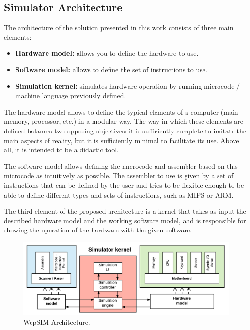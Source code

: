\subsection*{Simulator Architecture}

The architecture of the solution presented in this work consists of three main elements:

\begin{itemize}
\item \textbf{Hardware model:} allows you to define the hardware to use.
\item \textbf{Software model:} allows to define the set of instructions to use.
\item \textbf{Simulation kernel:} simulates hardware operation by running microcode / machine language previously defined.
\end{itemize}

The hardware model allows to define the typical elements of a computer (main memory, processor, etc.) in a modular way. The way in which these elements are defined balances two opposing objectives: it is sufficiently complete to imitate the main aspects of reality, but it is sufficiently minimal to facilitate its use. Above all, it is intended to be a didactic tool.

The software model allows defining the microcode and assembler based on this microcode as intuitively as possible. The assembler to use is given by a set of instructions that can be defined by the user and tries to be flexible enough to be able to define different types and sets of instructions, such as MIPS or ARM.

The third element of the proposed architecture is a kernel that takes as input the described hardware model and the working software model, and is responsible for showing the operation of the hardware with the given software.

\begin{figure}[htbp]
 	\centering
 	\includegraphics[width=14cm]{figures/architecture_diagram}
 	\caption{WepSIM Architecture.}
	\label{fig:architecture_diagram_summary}
\end{figure}

